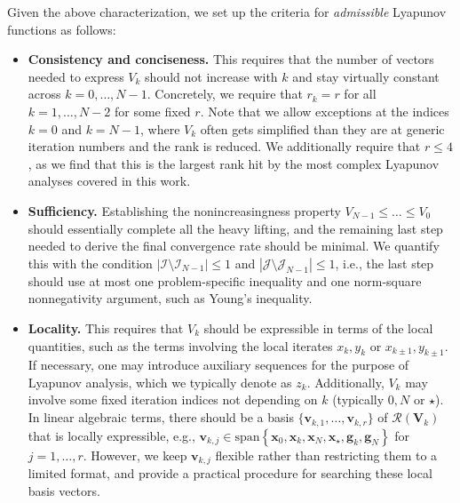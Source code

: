 \documentclass{article}
\theoremstyle{definition}
\theoremstyle{plain}
\newcommand{\vg}{{\mathbf{g}}}
\newcommand{\vv}{{\mathbf{v}}}
\newcommand{\vx}{{\mathbf{x}}}
\newcommand{\vV}{{\mathbf{V}}}
\newcommand{\cI}{{\mathcal{I}}}
\newcommand{\cJ}{{\mathcal{J}}}
\newcommand{\cR}{{\mathcal{R}}}
\begin{document}
Given the above characterization, we set up the criteria for \emph{admissible} Lyapunov functions as follows:
\begin{itemize}
    \item \textbf{Consistency and conciseness.} This requires that the number of vectors needed to express $V_k$ should not increase with $k$ and stay virtually constant across $k=0,\dots,N-1$.
    Concretely, we require that $r_k = r$ for all $k=1,\dots,N-2$ for some fixed $r$.
    Note that we allow exceptions at the indices $k=0$ and $k=N-1$, where $V_k$ often gets simplified than they are at generic iteration numbers and the rank is reduced.
    We additionally require that $r\le 4$, as we find that this is the largest rank hit by the most complex Lyapunov analyses covered in this work.

    \item \textbf{Sufficiency.} Establishing the nonincreasingness property $V_{N-1} \le \dots \le V_0$ should essentially complete all the heavy lifting, and the remaining last step needed to derive the final convergence rate should be minimal.
    We quantify this with the condition $|\cI \setminus \cI_{N-1}| \le 1$ and $|\cJ \setminus \cJ_{N-1}| \le 1$, i.e., the last step should use at most one problem-specific inequality and one norm-square nonnegativity argument, such as Young's inequality.
    
    \item \textbf{Locality.} This requires that $V_k$ should be expressible in terms of the local quantities, such as the terms involving the local iterates $x_k, y_k$ or $x_{k\pm 1}, y_{k\pm 1}$.
    If necessary, one may introduce auxiliary sequences for the purpose of Lyapunov analysis, which we typically denote as $z_k$.
    Additionally, $V_k$ may involve some fixed iteration indices not depending on $k$ (typically $0, N$ or $\star$).
    In linear algebraic terms, there should be a basis $\{\vv_{k,1},\dots,\vv_{k,r}\}$ of $\cR(\vV_k)$ that is locally expressible, e.g., $\vv_{k,j} \in \mathrm{span}\left\{ \vx_0, \vx_k, \vx_N, \vx_\star, \vg_k, \vg_N \right\}$ for $j=1,\dots,r$.
    However, we keep $\vv_{k,j}$ flexible rather than restricting them to a limited format, and provide a practical procedure for searching these local basis vectors.
\end{itemize}
\end{document}
